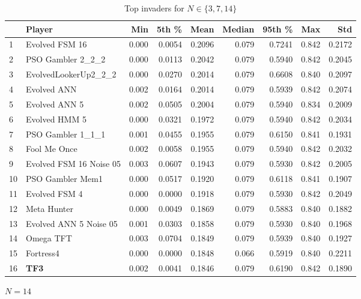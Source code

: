 \documentclass[10pt,letterpaper]{article}
\begin{document}
\begin{table}[!hbtp]
    \begin{subfigure}[t]{\columnwidth}
        \centering
            \begin{tabular}{llrrrrrrr}
            \toprule
            {} &                   Player &    Min &   5th \% &    Mean &  Median &  95th \% &    Max &     Std \\
            \midrule
            1  &           Evolved FSM 16 &  0.000 &  0.0054 &  0.2096 &   0.079 &  0.7241 &  0.842 &  0.2172 \\
            2  &        PSO Gambler 2\_2\_2 &  0.000 &  0.0113 &  0.2042 &   0.079 &  0.5940 &  0.842 &  0.2045 \\
            3  &     EvolvedLookerUp2\_2\_2 &  0.000 &  0.0270 &  0.2014 &   0.079 &  0.6608 &  0.840 &  0.2097 \\
            4  &              Evolved ANN &  0.002 &  0.0164 &  0.2014 &   0.079 &  0.5939 &  0.842 &  0.2074 \\
            5  &            Evolved ANN 5 &  0.002 &  0.0505 &  0.2004 &   0.079 &  0.5940 &  0.834 &  0.2009 \\
            6  &            Evolved HMM 5 &  0.000 &  0.0321 &  0.1972 &   0.079 &  0.5940 &  0.842 &  0.2034 \\
            7  &        PSO Gambler 1\_1\_1 &  0.001 &  0.0455 &  0.1955 &   0.079 &  0.6150 &  0.841 &  0.1931 \\
            8  &             Fool Me Once &  0.002 &  0.0058 &  0.1955 &   0.079 &  0.5940 &  0.842 &  0.2032 \\
            9  &  Evolved FSM 16 Noise 05 &  0.003 &  0.0607 &  0.1943 &   0.079 &  0.5930 &  0.842 &  0.2005 \\
            10 &         PSO Gambler Mem1 &  0.000 &  0.0517 &  0.1920 &   0.079 &  0.6118 &  0.841 &  0.1907 \\
            11 &            Evolved FSM 4 &  0.000 &  0.0000 &  0.1918 &   0.079 &  0.5930 &  0.842 &  0.2049 \\
            12 &              Meta Hunter &  0.000 &  0.0049 &  0.1869 &   0.079 &  0.5883 &  0.840 &  0.1882 \\
            13 &   Evolved ANN 5 Noise 05 &  0.001 &  0.0303 &  0.1858 &   0.079 &  0.5930 &  0.840 &  0.1968 \\
            14 &                Omega TFT &  0.003 &  0.0704 &  0.1849 &   0.079 &  0.5939 &  0.840 &  0.1927 \\
            15 &                Fortress4 &  0.000 &  0.0000 &  0.1848 &   0.066 &  0.5919 &  0.840 &  0.2211 \\
            16 &                      \textbf{TF3} &  0.002 &  0.0041 &  0.1846 &   0.079 &  0.6190 &  0.842 &  0.1890 \\
            \bottomrule
            \end{tabular}
        \caption{\(N=14\)}
    \end{subfigure}
    \caption{Top invaders for \(N\in\{3, 7, 14\}\)}
    \label{tbl:top_invade}
\end{table}
\end{document}
